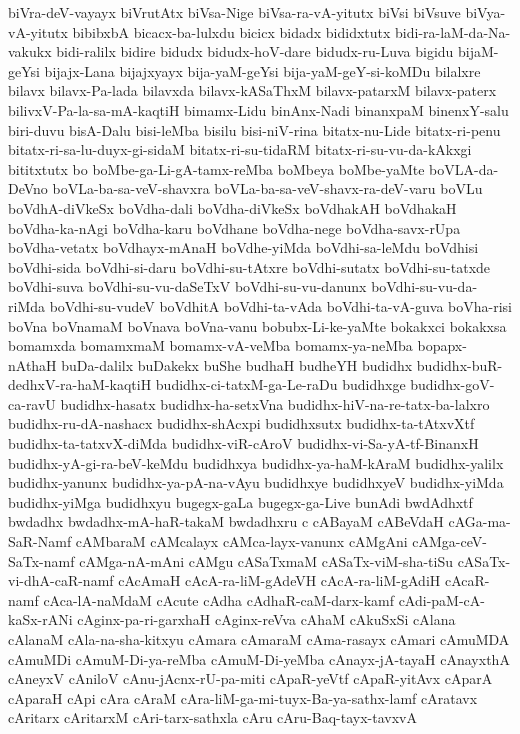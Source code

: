 {biVra-deV-vayayx
biVrutAtx
biVsa-Nige
biVsa-ra-vA-yitutx
biVsi
biVsuve
biVya-vA-yitutx
bibibxbA
bicacx-ba-lulxdu
bicicx
bidadx
bididxtutx
bidi-ra-laM-da-Na-vakukx
bidi-ralilx
bidire
bidudx
bidudx-hoV-dare
bidudx-ru-Luva
bigidu
bijaM-geYsi
bijajx-Lana
bijajxyayx
bija-yaM-geYsi
bija-yaM-geY-si-koMDu
bilalxre
bilavx
bilavx-Pa-lada
bilavxda
bilavx-kASaThxM
bilavx-patarxM
bilavx-paterx
bilivxV-Pa-la-sa-mA-kaqtiH
bimamx-Lidu
binAnx-Nadi
binanxpaM
binenxY-salu
biri-duvu
bisA-Dalu
bisi-leMba
bisilu
bisi-niV-rina
bitatx-nu-Lide
bitatx-ri-penu
bitatx-ri-sa-lu-duyx-gi-sidaM
bitatx-ri-su-tidaRM
bitatx-ri-su-vu-da-kAkxgi
bititxtutx
bo
boMbe-ga-Li-gA-tamx-reMba
boMbeya
boMbe-yaMte
boVLA-da-DeVno
boVLa-ba-sa-veV-shavxra
boVLa-ba-sa-veV-shavx-ra-deV-varu
boVLu
boVdhA-diVkeSx
boVdha-dali
boVdha-diVkeSx
boVdhakAH
boVdhakaH
boVdha-ka-nAgi
boVdha-karu
boVdhane
boVdha-nege
boVdha-savx-rUpa
boVdha-vetatx
boVdhayx-mAnaH
boVdhe-yiMda
boVdhi-sa-leMdu
boVdhisi
boVdhi-sida
boVdhi-si-daru
boVdhi-su-tAtxre
boVdhi-sutatx
boVdhi-su-tatxde
boVdhi-suva
boVdhi-su-vu-daSeTxV
boVdhi-su-vu-danunx
boVdhi-su-vu-da-riMda
boVdhi-su-vudeV
boVdhitA
boVdhi-ta-vAda
boVdhi-ta-vA-guva
boVha-risi
boVna
boVnamaM
boVnava
boVna-vanu
bobubx-Li-ke-yaMte
bokakxci
bokakxsa
bomamxda
bomamxmaM
bomamx-vA-veMba
bomamx-ya-neMba
bopapx-nAthaH
buDa-dalilx
buDakekx
buShe
budhaH
budheYH
budidhx
budidhx-buR-dedhxV-ra-haM-kaqtiH
budidhx-ci-tatxM-ga-Le-raDu
budidhxge
budidhx-goV-ca-ravU
budidhx-hasatx
budidhx-ha-setxVna
budidhx-hiV-na-re-tatx-ba-lalxro
budidhx-ru-dA-nashacx
budidhx-shAcxpi
budidhxsutx
budidhx-ta-tAtxvXtf
budidhx-ta-tatxvX-diMda
budidhx-viR-cAroV
budidhx-vi-Sa-yA-tf-BinanxH
budidhx-yA-gi-ra-beV-keMdu
budidhxya
budidhx-ya-haM-kAraM
budidhx-yalilx
budidhx-yanunx
budidhx-ya-pA-na-vAyu
budidhxye
budidhxyeV
budidhx-yiMda
budidhx-yiMga
budidhxyu
bugegx-gaLa
bugegx-ga-Live
bunAdi
bwdAdhxtf
bwdadhx
bwdadhx-mA-haR-takaM
bwdadhxru
c
cABayaM
cABeVdaH
cAGa-ma-SaR-Namf
cAMbaraM
cAMcalayx
cAMca-layx-vanunx
cAMgAni
cAMga-ceV-SaTx-namf
cAMga-nA-mAni
cAMgu
cASaTxmaM
cASaTx-viM-sha-tiSu
cASaTx-vi-dhA-caR-namf
cAcAmaH
cAcA-ra-liM-gAdeVH
cAcA-ra-liM-gAdiH
cAcaR-namf
cAca-lA-naMdaM
cAcute
cAdha
cAdhaR-caM-darx-kamf
cAdi-paM-cA-kaSx-rANi
cAginx-pa-ri-garxhaH
cAginx-reVva
cAhaM
cAkuSxSi
cAlana
cAlanaM
cAla-na-sha-kitxyu
cAmara
cAmaraM
cAma-rasayx
cAmari
cAmuMDA
cAmuMDi
cAmuM-Di-ya-reMba
cAmuM-Di-yeMba
cAnayx-jA-tayaH
cAnayxthA
cAneyxV
cAniloV
cAnu-jAcnx-rU-pa-miti
cApaR-yeVtf
cApaR-yitAvx
cAparA
cAparaH
cApi
cAra
cAraM
cAra-liM-ga-mi-tuyx-Ba-ya-sathx-lamf
cAratavx
cAritarx
cAritarxM
cAri-tarx-sathxla
cAru
cAru-Baq-tayx-tavxvA
}
